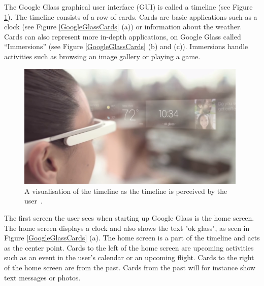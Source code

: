 The Google Glass graphical user interface (GUI) is called a timeline\cite{ImagesGoogleGlassUI} (see Figure \ref{GoogleGlassUI}). The timeline consists of a row of cards. Cards are basic applications such as a clock (see Figure \ref{GoogleGlassCards} (a)) or information about the weather. Cards can also represent more in-depth applications, on Google Glass called ``Immersions'' (see Figure \ref{GoogleGlassCards} (b) and (c)). Immersions handle activities such as browsing an image gallery or playing a game.

	\begin{figure}[ht!]
		\centering
		\includegraphics[width=110mm]{images/GoogleGlassUI}
		\caption{A visualisation of the timeline as the timeline is perceived by the user~\cite{ImagesGoogleGlassUI}.}
		\label{GoogleGlassUI}
	\end{figure}

The first screen the user sees when starting up Google Glass is the home screen. The home screen displays a clock and also shows the text "ok glass", as seen in Figure \ref{GoogleGlassCards} (a). The home screen is a part of the timeline and acts as the center point. Cards to the left of the home screen are upcoming activities such as an event in the user's calendar or an upcoming flight. Cards to the right of the home screen are from the past. Cards from the past will for instance show text messages or photos.

